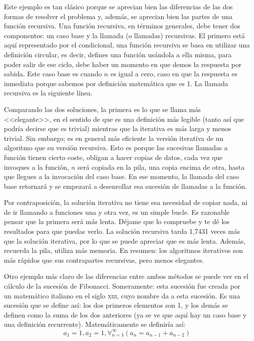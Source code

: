 \documentclass[a4paper]{article}
\begin{document}
Este ejemplo es tan clásico porque se aprecian bien las diferencias de las dos
formas de resolver el problema y, además, se aprecian bien las partes de una
función recursiva. Una función recursiva, en términos generales, debe tener dos
componentes: un caso base y la llamada (o llamadas) recursivas.
El primero está aquí
representado por el condicional, una función recursiva se basa en utilizar
una definición circular, es decir, defines una función usándola a ella misma,
para poder salir de ese ciclo, debe haber un momento en que demos la respuesta
por sabida. Este caso base es cuando $n$ es igual a cero, caso en que la respuesta
es inmediata porque sabemos por definición matemática que es 1. La llamada
recursiva es la siguiente línea.

Comparando las dos soluciones, la primera es lo que se llama más <<elegante>>,
en el sentido de que es una definición más legible (tanto así que podría decirse
que es trivial) mientras que la iterativa es más larga y menos trivial. Sin
embargo; es en general más eficiente la versión iterativa de un algoritmo que
su versión recursiva. Esto es porque las sucesivas llamadas a función tienen
cierto coste, obligan a hacer copias de datos, cada vez que invoques a la
función, $n$ será copiada en la pila, una copia encima de otra, hasta que llegues
a la invocación del caso base. En ese momento, la llamada del caso base
retornará y se empezará a desenrollar esa sucesión de llamadas a la función.

Por contraposición, la solución iterativa no tiene esa necesidad de copiar nada,
ni de ir llamando a funciones una y otra vez, es un simple bucle. Es razonable
pensar que la primera será más lenta. Déjame que lo compruebe y te dé los
resultados para que puedas verlo. La solución recursiva tarda 1,7431 veces más
que la solución iterativa, por lo que se puede apreciar que es más lenta.
Además, recuerda la pila, utiliza más memoria.
En resumen: los algoritmos iterativos son más rápidos que sus contrapartes
recursivas, pero menos elegantes.

Otro ejemplo más claro de las diferencias entre ambos métodos se puede ver en
el cálculo de la sucesión de Fibonacci. Someramente: esta sucesión fue creada
por un matemático italiano en el siglo \textsc{xiii}, cuyo nombre da a esta
sucesión. Es una sucesión que se define así: los dos primeros elementos son 1,
y los demás se definen como la suma de los dos anteriores (ya
se ve que aquí hay un caso base y una definición recurrente). Matemáticamente se
definiría así:
$$
a_1 = 1, a_2 = 1, \forall_{n=3}^{\infty}\left(a_n = a_{n-1} + a_{n-2}\right)
$$
\end{document}
